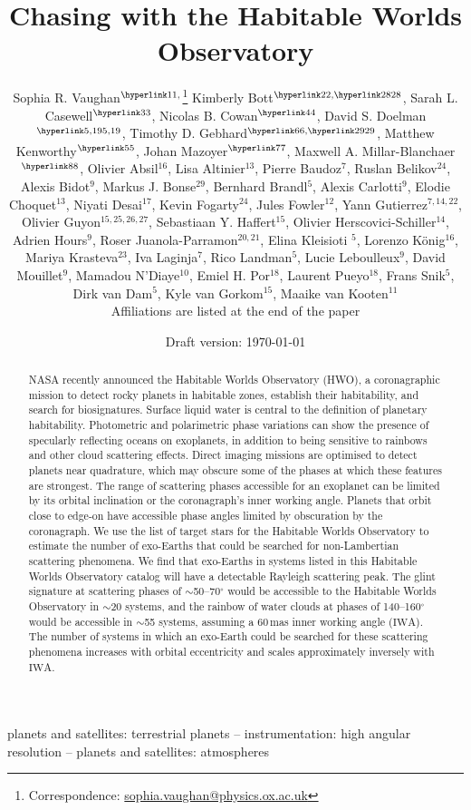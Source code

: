 \documentclass[
    usenatbib,
]{mnras}
\title{Chasing \rainbows{} with the Habitable Worlds Observatory}
\author[Sophia R. Vaughan et al.]{%
    Sophia R. Vaughan$^{\affiliationlink{1},}$\thanks{Correspondence:  \url{sophia.vaughan@physics.ox.ac.uk}}
    Kimberly Bott$^{\affiliationlink{2},\affiliationlink{28}}$,
    Sarah L. Casewell$^{\affiliationlink{3}}$,
    Nicolas B. Cowan$^{\affiliationlink{4}}$,
    David S. Doelman$^{\affiliationlink{5,19}}$,
    \newauthor 
    Timothy D. Gebhard$^{\affiliationlink{6},\affiliationlink{29}}$,
    Matthew Kenworthy$^{\affiliationlink{5}}$,
    Johan Mazoyer$^{\affiliationlink{7}}$,
    Maxwell A. Millar-Blanchaer$^{\affiliationlink{8}}$,
    \newauthor 
    Olivier Absil$^{16}$,
    Lisa Altinier$^{13}$,
    Pierre Baudoz$^{7}$,
    Ruslan Belikov$^{24}$,
    Alexis Bidot$^{9}$,
    Markus J. Bonse$^{29}$,
    \newauthor 
    Bernhard Brandl$^{5}$,
    Alexis Carlotti$^{9}$,
    Elodie Choquet$^{13}$,
    Niyati Desai$^{17}$,
    Kevin Fogarty$^{24}$,
    Jules Fowler$^{12}$,
    \newauthor
    Yann Gutierrez$^{7,14,22}$,
    Olivier Guyon$^{15,25,26,27}$,
    Sebastiaan Y. Haffert$^{15}$,
    Olivier Herscovici-Schiller$^{14}$, 
    \newauthor
    Adrien Hours$^{9}$,
    Roser Juanola-Parramon$^{20,21}$,
    Elina Kleisioti $^{5}$,
    Lorenzo König$^{16}$,
    Mariya Krasteva$^{23}$, 
    \newauthor
    Iva Laginja$^{7}$,
    Rico Landman$^{5}$,
    Lucie Leboulleux$^{9}$,
    David Mouillet$^{9}$,
    Mamadou N’Diaye$^{10}$,
    Emiel H. Por$^{18}$,
    \newauthor
    Laurent Pueyo$^{18}$,
    Frans Snik$^{5}$,
    Dirk van Dam$^{5}$,
    Kyle van Gorkom$^{15}$,
    Maaike van Kooten$^{11}$ 
    \newauthor \\%
    Affiliations are listed at the end of the paper
}
\date{Draft version: \today}
\newcommand{\IWA}{\ensuremath{\mathrm{IWA}}}
\begin{document}
 

\maketitle

\begin{abstract}
NASA recently announced the Habitable Worlds Observatory (HWO), a coronagraphic mission to detect rocky planets in habitable zones, establish their habitability, and search for biosignatures. 
Surface liquid water is central to the definition of planetary habitability.
Photometric and polarimetric phase variations can show the presence of specularly reflecting oceans on exoplanets, in addition to being sensitive to rainbows and other cloud scattering effects. 
Direct imaging missions are optimised to detect planets near quadrature, which may obscure some of the phases at which these features are strongest. 
The range of scattering phases accessible for an exoplanet can be limited by its orbital inclination or the coronagraph's inner working angle. 
Planets that orbit close to edge-on have accessible phase angles limited by obscuration by the coronagraph. 
We use the list of target stars for the Habitable Worlds Observatory to estimate the number of exo-Earths that could be searched for non-Lambertian scattering phenomena. 
We find that exo-Earths in systems listed in this Habitable Worlds Observatory catalog will have a detectable Rayleigh scattering peak. 
The glint signature at scattering phases of $\sim$50--70$^\circ$ would be accessible to the Habitable Worlds Observatory in $\sim$20 systems, and the rainbow of water clouds at phases of 140--160$^\circ$ would be accessible in $\sim$55 systems, assuming a 60\,mas inner working angle (\IWA). 
The number of systems in which an exo-Earth could be searched for these scattering phenomena increases with orbital eccentricity and scales approximately inversely with \IWA.     \end{abstract}

\begin{keywords}
planets and satellites: terrestrial planets -- 
instrumentation: high angular resolution -- 
planets and satellites: atmospheres
\end{keywords}
\end{document}
